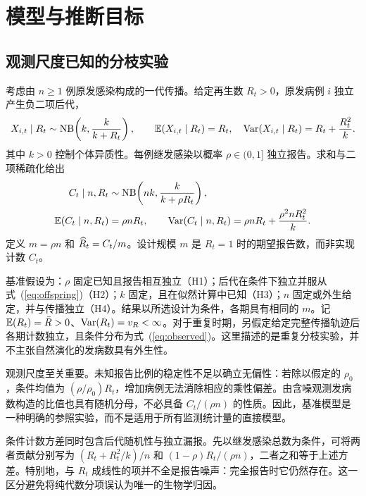 \section{模型与推断目标}
\label{sec:background}

\subsection{观测尺度已知的分枝实验}
\label{sec:bg-model}

考虑由 $n\ge1$ 例原发感染构成的一代传播。给定再生数 $R_t>0$，原发病例 $i$ 独立产生负二项后代\citep{lloydsmith2005superspreading}，
\begin{equation}
  X_{i,t}\mid R_t\sim\mathrm{NB}\!\left(k,\frac{k}{k+R_t}\right),\qquad
  \mathbb{E}(X_{i,t}\mid R_t)=R_t,\quad
  \mathrm{Var}(X_{i,t}\mid R_t)=R_t+\frac{R_t^2}{k}.
  \label{eq:offspring}
\end{equation}
其中 $k>0$ 控制个体异质性。每例继发感染以概率 $\rho\in(0,1]$ 独立报告。求和与二项稀疏化给出
\begin{equation}
\begin{aligned}
  C_t\mid n,R_t&\sim\mathrm{NB}\!\left(nk,\frac{k}{k+\rho R_t}\right),\\
  \mathbb{E}(C_t\mid n,R_t)&=\rho nR_t,\qquad
  \mathrm{Var}(C_t\mid n,R_t)=\rho nR_t+\frac{\rho^2nR_t^2}{k}.
\end{aligned}
  \label{eq:observed}
\end{equation}
定义 $m=\rho n$ 和 $\widehat R_t=C_t/m$。设计规模 $m$ 是 $R_t=1$ 时的期望报告数，而非实现计数 $C_t$。

基准假设为：$\rho$ 固定已知且报告相互独立（H1）；后代在条件下独立并服从式~(\ref{eq:offspring})（H2）；$k$ 固定，且在似然计算中已知（H3）；$n$ 固定或外生给定，并与传播独立（H4）。结果以所选设计为条件，各期具有相同的 $m$。记 $\mathbb{E}(R_t)=\bar R>0$、$\mathrm{Var}(R_t)=v_R<\infty$。对于重复时期，另假定给定完整传播轨迹后各期计数独立，且条件分布为式~(\ref{eq:observed})。这里描述的是重复分枝实验，并不主张自然演化的发病数具有外生性。

观测尺度至关重要。未知报告比例的稳定性不足以确立无偏性：若除以假定的 $\rho_0$，条件均值为 $(\rho/\rho_0)R_t$，增加病例无法消除相应的乘性偏差。由含噪观测发病数构造的比值也具有随机分母，不必具备 $C_t/(\rho n)$ 的性质。因此，基准模型是一种明确的参照实验，而不是适用于所有监测统计量的直接模型。

条件计数方差同时包含后代随机性与独立漏报。先以继发感染总数为条件，可将两者贡献分别写为 $(R_t+R_t^2/k)/n$ 和 $(1-\rho)R_t/(\rho n)$，二者之和等于上述方差。特别地，与 $R_t$ 成线性的项并不全是报告噪声：完全报告时它仍然存在。这一区分避免将纯代数分项误认为唯一的生物学归因。

